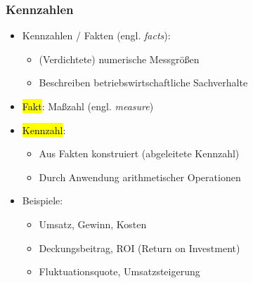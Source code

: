         \begin{frame}

        \frametitle{Kennzahlen}
        \begin{itemize}
        \item Kennzahlen / Fakten (engl. \emph{facts}):
          \begin{itemize}
          \item (Verdichtete) numerische Messgrößen
          \item Beschreiben betriebswirtschaftliche Sachverhalte
          \end{itemize}
        \item \hl{Fakt}: Maßzahl (engl. \emph{measure})
        \item \hl{Kennzahl}:
          \begin{itemize}
          \item Aus Fakten konstruiert (abgeleitete Kennzahl)
          \item Durch Anwendung arithmetischer Operationen
          \end{itemize}
        \item  Beispiele:
          \begin{itemize}
          \item Umsatz, Gewinn, Kosten
          \item Deckungsbeitrag, ROI (Return on Investment)
          \item Fluktuationsquote, Umsatzsteigerung
          \end{itemize}
        \end{itemize}

        \end{frame}


